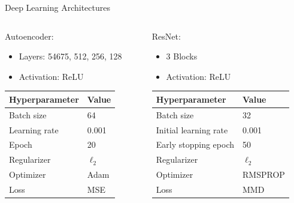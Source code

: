 \documentclass{beamer}
\begin{document}
\begin{frame}{Deep Learning Architectures}
  \begin{columns}
    \begin{column}[t]{.48\textwidth}
      Autoencoder:
      \begin{itemize}
        \item Layers: 54675, 512, 256, 128
        \item Activation: ReLU
      \end{itemize}\vspace{0.9cm}
      \begin{tabular}{ll}
        \toprule
        Hyperparameter&Value\\
        \midrule
        Batch size&64\\
        Learning rate&0.001\\
        Epoch&20\\
        Regularizer&$\ell_{2}$\\
        Optimizer&Adam\\
        Loss&MSE\\
        \bottomrule
      \end{tabular}
    \end{column}
    \begin{column}[t]{.48\textwidth}
      ResNet:
      \begin{itemize}
        \item 3 Blocks
        \item Activation: ReLU
      \end{itemize}\vspace{0.9cm}
      \begin{tabular}{ll}
        \toprule
        Hyperparameter&Value\\
        \midrule
        Batch size&32\\
        Initial learning rate&0.001\\
        Early stopping epoch&50\\
        Regularizer&$\ell_{2}$\\
        Optimizer&RMSPROP\\
        Loss&MMD\\
        \bottomrule
      \end{tabular}
    \end{column}
  \end{columns}
\end{frame}
\end{document}
